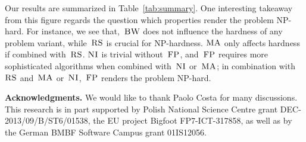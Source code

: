 \documentclass[preprint,12pt]{elsarticle}
\newcommand{\maciek}[1]{\textcolor{brown}{maciek: #1}}
\newcommand{\CC}{\textsc{NI}}
\newcommand{\FP}{\textsc{FP}}
\newcommand{\RS}{\textsc{RS}}
\newcommand{\BW}{\textsc{BW}}
\newcommand{\MA}{\textsc{MA}}
\begin{document}
Our results are summarized in
Table~\ref{tab:summary}.
One interesting takeaway from this figure regards
the question which properties render the problem
NP-hard. For instance, we see that,~$\BW$
does not influence the hardness of any problem variant,
while~$\RS$ is crucial for NP-hardness.
$\MA$ only affects hardness if combined with~$\RS$.
$\CC$ is trivial without~$\FP$, and~$\FP$ requires
more sophisticated algorithms when combined with~$\CC$ or~$\MA$;
in combination with~$\RS$ and~$\MA$ or~$\CC$,~$\FP$ renders the
problem NP-hard.





\textbf{Acknowledgments.} We would like to thank 
Paolo Costa for many discussions. 
This research is in part supported by Polish National Science Centre grant DEC-2013/09/B/ST6/01538, the EU project Bigfoot FP7-ICT-317858,
as well as by the German BMBF Software Campus grant 01IS12056.

%
{\footnotesize \renewcommand{\baselinestretch}{.9}


}

\end{document}
